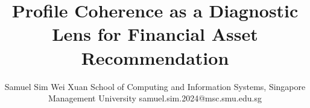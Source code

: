\title{Profile Coherence as a Diagnostic Lens for Financial Asset Recommendation}

\author{
    Samuel Sim Wei Xuan
    \affiliations
    School of Computing and Information Systems, Singapore Management University
    \emails
    samuel.sim.2024@msc.smu.edu.sg
}
